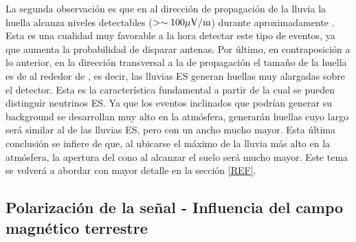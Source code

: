 	La segunda observación es que en al dirección de propagación de la lluvia la huella alcanza niveles detectables ($>\sim100{\rm \mu V/m}$) durante aproximadamente .
	Esta es una cualidad muy favorable a la hora detectar este tipo de eventos, ya que aumenta la probabilidad de disparar antenas.
	Por último, en contraposición a lo anterior, en la dirección transversal a la de propagación el tamaño de la huella es de al rededor de , es decir, las lluvias ES generan huellas muy alargadas sobre el detector.
	Esta es la característica fundamental a partir de la cual se pueden distinguír neutrinos ES. 
	Ya que los eventos inclinados que podrían generar su background se desarrollan muy alto en la atmósfera, generarán huellas cuyo largo será similar al de las lluvias ES, pero con un ancho mucho mayor.
	Esta última conclusión se infiere de que, al ubicarse el máximo de la lluvia más alto en la atmósfera, la apertura del cono al alcanzar el suelo será mucho mayor.
	Este tema se volverá a abordar con mayor detalle en la sección \ref{REF}.
	
	\subsection{Polarización de la señal - Influencia del campo magn\'etico terrestre}
	
